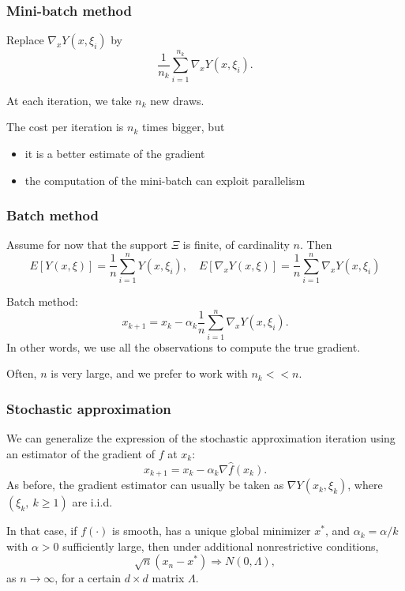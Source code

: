 \documentclass{beamer}
\begin{document}
\begin{frame}
\frametitle{Mini-batch method}

Replace $\nabla_x Y(x,\xi_i)$ by
$$
\frac{1}{n_k} \sum_{i = 1}^{n_k} \nabla_x Y(x,\xi_i).
$$

\mbox{}

At each iteration, we take $n_k$ new draws.

\mbox{}

The cost per iteration is $n_k$ times bigger, but
\begin{itemize}
	\item it is a better estimate of the gradient
	\item the computation of the mini-batch can exploit parallelism
\end{itemize}

\end{frame}

\begin{frame}
\frametitle{Batch method}

Assume for now that the support $\Xi$ is finite, of cardinality $n$. Then
$$
E[Y(x,\xi)] = \frac{1}{n} \sum_{i = 1}^n Y(x,\xi_i), \quad E[\nabla_x Y(x,\xi)] = \frac{1}{n} \sum_{i = 1}^n \nabla_x Y(x,\xi_i)
$$

\mbox{}

Batch method:
$$
x_{k+1} = x_k - \alpha_k \frac{1}{n} \sum_{i = 1}^{n} \nabla_x Y(x,\xi_i).
$$
In other words, we use all the observations to compute the true gradient.

\mbox{}

Often, $n$ is very large, and we prefer to work with $n_k << n$.

\end{frame}

\begin{frame}
\frametitle{Stochastic approximation}

We can generalize the expression of the stochastic approximation iteration using an estimator of the gradient of $f$ at $x_k$:
$$
x_{k+1} = x_k - \alpha_k\nabla\hat{f}(x_k).
$$
As before, the gradient estimator can usually be taken as $\nabla Y ( x_k, \xi_k )$,
where $(\xi_k,\ k \geq 1)$ are i.i.d.

\mbox{}

In that case, if $f(\cdot)$ is smooth, has a unique global minimizer $x^*$, and $\alpha_k = \alpha / k$ with $\alpha > 0$ sufficiently large, then under additional nonrestrictive conditions,
$$
\sqrt{n} \left(x_n - x^*\right) \Rightarrow N(0, \Lambda), 
$$
as $n \rightarrow \infty$, for a certain $d \times d$ matrix $\Lambda$.

\end{frame}
\end{document}
